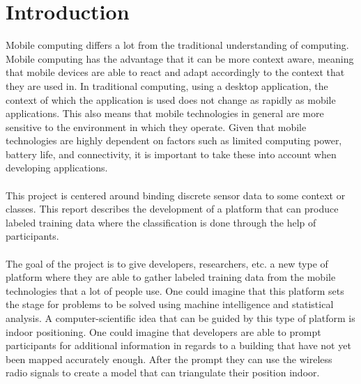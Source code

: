 \chapter{Introduction}
\label{cha:introduction}
Mobile computing  differs a lot from the traditional understanding of computing. Mobile computing has the advantage that it can be more context aware, meaning that mobile devices are able to react and adapt accordingly to the context that they are used in. In traditional computing, using a desktop application, the context of which the application is used does not change as rapidly as mobile applications. This also means that mobile technologies in general are more sensitive to the environment in which they operate. Given that mobile technologies are highly dependent on factors such as limited computing power, battery life, and connectivity, it is important to take these into account when developing applications.
\\\\
This project is centered around binding discrete sensor data to some context or classes. This report describes the development of a platform that can produce labeled training data where the classification is done through the help of participants. 
\\\\
The goal of the project is to give developers, researchers, etc. a new type of platform where they are able to gather labeled training data from the mobile technologies that a lot of people use. One could imagine that this platform sets the stage for problems to be solved using machine intelligence and statistical analysis. A computer-scientific idea that can be guided by this type of platform is indoor positioning. One could imagine that developers are able to prompt participants for additional information in regards to a building that have not yet been mapped accurately enough. After the prompt they can use the wireless radio signals to create a model that can triangulate their position indoor. 


